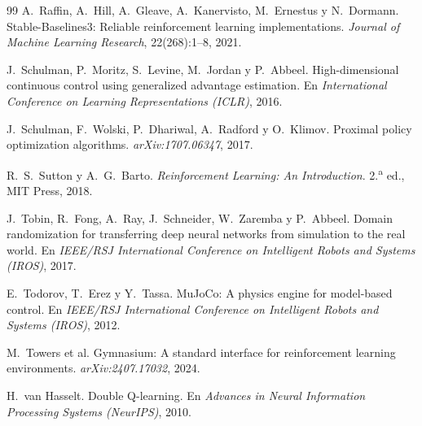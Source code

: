 \documentclass[11pt,a4paper]{article}
\begin{document}
\begin{thebibliography}{99}
 A.~Raffin, A.~Hill, A.~Gleave, A.~Kanervisto, M.~Ernestus y N.~Dormann. Stable-Baselines3: Reliable reinforcement learning implementations. \emph{Journal of Machine Learning Research}, 22(268):1--8, 2021.

 J.~Schulman, P.~Moritz, S.~Levine, M.~Jordan y P.~Abbeel. High-dimensional continuous control using generalized advantage estimation. En \emph{International Conference on Learning Representations (ICLR)}, 2016.

 J.~Schulman, F.~Wolski, P.~Dhariwal, A.~Radford y O.~Klimov. Proximal policy optimization algorithms. \emph{arXiv:1707.06347}, 2017.

 R.~S.~Sutton y A.~G.~Barto. \emph{Reinforcement Learning: An Introduction}. 2.\textsuperscript{a} ed., MIT Press, 2018.

 J.~Tobin, R.~Fong, A.~Ray, J.~Schneider, W.~Zaremba y P.~Abbeel. Domain randomization for transferring deep neural networks from simulation to the real world. En \emph{IEEE/RSJ International Conference on Intelligent Robots and Systems (IROS)}, 2017.

 E.~Todorov, T.~Erez y Y.~Tassa. MuJoCo: A physics engine for model-based control. En \emph{IEEE/RSJ International Conference on Intelligent Robots and Systems (IROS)}, 2012.

 M.~Towers et al. Gymnasium: A standard interface for reinforcement learning environments. \emph{arXiv:2407.17032}, 2024.

 H.~van Hasselt. Double Q-learning. En \emph{Advances in Neural Information Processing Systems (NeurIPS)}, 2010.

\end{thebibliography}
\end{document}
